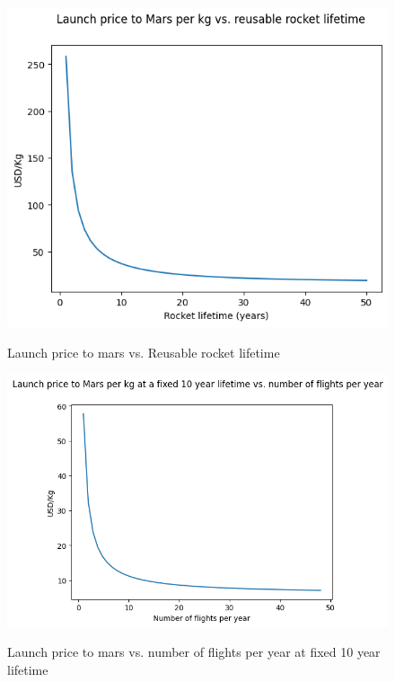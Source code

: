 \documentclass[fleqn,10pt]{Stylesheet} %
\begin{document}
\begin{figure}
    \centering
    \includegraphics[width=\linewidth]{fig_reuse.png}
    \label{fig:numflights}
    \caption{Launch price to mars vs. Reusable rocket lifetime}
\end{figure}

\begin{figure}
    \centering
    \includegraphics[width=\linewidth]{fig_numflights.png}
    \label{fig:numflights}
    \caption{Launch price to mars vs. number of flights per year at fixed 10 year lifetime}
\end{figure}

\end{document}
